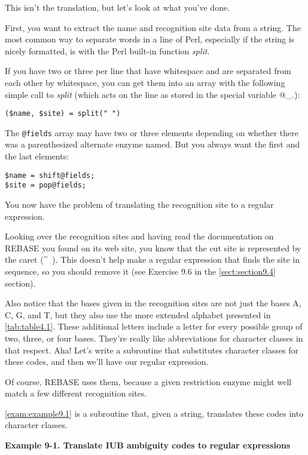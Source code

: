 This isn't the translation, but let's look at what you've done.

First, you want to extract the name and recognition site data from a string. The most common way to separate words in a line of Perl, especially if the string is nicely formatted, is with the Perl built-in function \textit{split}.

If you have two or three per line that have whitespace and are separated from each other by whitespace, you can get them into an array with the following simple call to \textit{split} (which acts on the line as stored in the special variable @\_.):

\begin{lstlisting}
($name, $site) = split(" ")
\end{lstlisting}

The \verb|@fields| array may have two or three elements depending on whether there was a parenthesized alternate enzyme named. But you always want the first and the last elements: 

\begin{lstlisting}
$name = shift@fields;
$site = pop@fields;
\end{lstlisting}

You now have the problem of translating the recognition site to a regular expression.

Looking over the recognition sites and having read the documentation on REBASE you found on its web site, you know that the cut site is represented by the caret (\^~). This doesn't help make a regular expression that finds the site in sequence, so you should remove it (see Exercise 9.6 in the \autoref{sect:section9.4} section).

Also notice that the bases given in the recognition sites are not just the bases A, C, G, and T, but they also use the more extended alphabet presented in \autoref{tab:table4.1}. These additional letters include a letter for every possible group of two, three, or four bases. They're really like abbreviations for character classes in that respect. Aha! Let's write a subroutine that substitutes character classes for these codes, and then we'll have our regular expression.

Of course, REBASE uses them, because a given restriction enzyme might well match a few different recognition sites.

\autoref{exam:example9.1} is a subroutine that, given a string, translates these codes into character classes. 

\textbf{Example 9-1. Translate IUB ambiguity codes to regular expressions}


